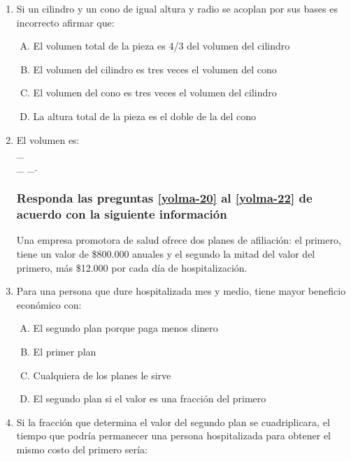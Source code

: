 \begin{enumerate}
\item Si un cilindro y un cono de igual altura y radio se acoplan por sus bases es incorrecto afirmar que: \label{yolma-18}\\

\begin{enumerate}[(A)]
\item  El volumen total de la pieza es 4/3 del volumen del cilindro
\item El volumen del cilindro es tres veces el volumen del cono
\item El volumen del cono es tres veces el volumen del cilindro
\item La altura total de la pieza es el doble de la del cono
\end{enumerate}


\item El volumen es: \label{yolma-19}\hrulefill\\
\_\hrulefill\\
\_\hrulefill
\_\hrulefill.


\subsubsection*{Responda las preguntas \ref{yolma-20} al \ref{yolma-22} de acuerdo con la siguiente información}

Una empresa promotora de salud ofrece dos planes de afiliación: el primero, tiene un valor de \$800.000 anuales y el segundo la mitad del valor del primero, más \$12.000 por cada día de hospitalización.

\item Para una persona que dure hospitalizada mes y medio, tiene mayor beneficio económico con: \label{yolma-20}\\

\begin{enumerate}[(A)]
\item  El segundo plan porque paga menos dinero
\item El primer plan
\item Cualquiera de los planes le sirve
\item El segundo plan si el valor es una fracción del primero
\end{enumerate}


\item Si la fracción que determina el valor del segundo plan se cuadriplicara, el tiempo que podría permanecer una persona hospitalizada para obtener el mismo costo del primero sería: \label{yolma-21}\\


\end{enumerate}
